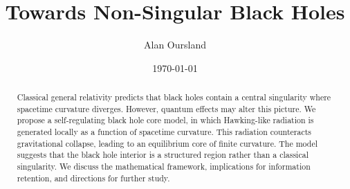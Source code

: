 \documentclass[12pt]{article}
\title{Towards Non-Singular Black Holes}
\author{Alan Oursland}
\date{\today}
\begin{document}
\maketitle

\begin{abstract}
Classical general relativity predicts that black holes contain a central singularity where spacetime curvature diverges. However, quantum effects may alter this picture. We propose a self-regulating black hole core model, in which Hawking-like radiation is generated locally as a function of spacetime curvature. This radiation counteracts gravitational collapse, leading to an equilibrium core of finite curvature. The model suggests that the black hole interior is a structured region rather than a classical singularity. We discuss the mathematical framework, implications for information retention, and directions for further study.
\end{abstract}

















\end{document}
